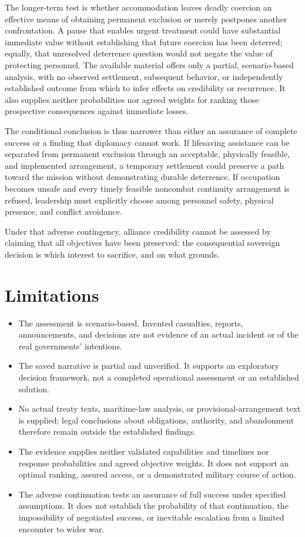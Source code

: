 \documentclass[11pt]{article}
\begin{document}
The longer-term test is whether accommodation leaves deadly coercion an effective means of obtaining permanent exclusion or merely postpones another confrontation. A pause that enables urgent treatment could have substantial immediate value without establishing that future coercion has been deterred; equally, that unresolved deterrence question would not negate the value of protecting personnel. The available material offers only a partial, scenario-based analysis, with no observed settlement, subsequent behavior, or independently established outcome from which to infer effects on credibility or recurrence. It also supplies neither probabilities nor agreed weights for ranking those prospective consequences against immediate losses.

The conditional conclusion is thus narrower than either an assurance of complete success or a finding that diplomacy cannot work. If lifesaving assistance can be separated from permanent exclusion through an acceptable, physically feasible, and implemented arrangement, a temporary settlement could preserve a path toward the mission without demonstrating durable deterrence. If occupation becomes unsafe and every timely feasible noncombat continuity arrangement is refused, leadership must explicitly choose among personnel safety, physical presence, and conflict avoidance.

Under that adverse contingency, alliance credibility cannot be assessed by claiming that all objectives have been preserved: the consequential sovereign decision is which interest to sacrifice, and on what grounds.

\section{Limitations}
\begin{itemize}
\item The assessment is scenario-based. Invented casualties, reports, announcements, and decisions are not evidence of an actual incident or of the real governments' intentions.
\item The saved narrative is partial and unverified. It supports an exploratory decision framework, not a completed operational assessment or an established solution.
\item No actual treaty texts, maritime-law analysis, or provisional-arrangement text is supplied; legal conclusions about obligations, authority, and abandonment therefore remain outside the established findings.
\item The evidence supplies neither validated capabilities and timelines nor response probabilities and agreed objective weights. It does not support an optimal ranking, assured access, or a demonstrated military course of action.
\item The adverse continuation tests an assurance of full success under specified assumptions. It does not establish the probability of that continuation, the impossibility of negotiated success, or inevitable escalation from a limited encounter to wider war.
\end{itemize}
\end{document}
